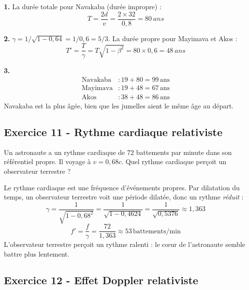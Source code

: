 \documentclass[12pt,a4paper]{article}
\begin{document}
\begin{boitecorrige}
\textbf{1.} La durée totale pour Navakaba (durée impropre) :
\[
T = \frac{2d}{v} = \frac{2\times32}{0{,}8} = \qty{80}{ans}
\]

\textbf{2.} $\gamma = 1/\sqrt{1-0{,}64} = 1/0{,}6 = 5/3$. La durée propre pour Mayimava et Akos :
\[
T' = \frac{T}{\gamma} = T\sqrt{1-\beta^2} = 80\times0{,}6 = \qty{48}{ans}
\]

\textbf{3.}
\begin{align*}
\text{Navakaba} &: 19+80 = \boxed{99\,\text{ans}}\\
\text{Mayimava}  &: 19+48 = \boxed{67\,\text{ans}}\\
\text{Akos}      &: 38+48 = \boxed{86\,\text{ans}}
\end{align*}
Navakaba est la plus âgée, bien que les jumelles aient le même âge au départ.
\end{boitecorrige}

\subsection*{Exercice 11 - Rythme cardiaque relativiste \niveau{\facile}}

\begin{boiteexercice}
Un astronaute a un rythme cardiaque de 72 battements par minute dans son référentiel propre. Il voyage à $v = 0{,}68c$. Quel rythme cardiaque perçoit un observateur terrestre ?
\end{boiteexercice}

\begin{boitecorrige}
Le rythme cardiaque est une fréquence d'événements propres. Par dilatation du temps, un observateur terrestre voit une période dilatée, donc un rythme \emph{réduit} :
\[
\gamma = \frac{1}{\sqrt{1-0{,}68^2}} = \frac{1}{\sqrt{1-0{,}4624}} = \frac{1}{\sqrt{0{,}5376}} \approx 1{,}363
\]
\[
f' = \frac{f}{\gamma} = \frac{72}{1{,}363} \approx \boxed{53\,\text{battements/min}}
\]
L'observateur terrestre perçoit un rythme ralenti : le c\oe{}ur de l'astronaute semble battre plus lentement.
\end{boitecorrige}

\subsection*{Exercice 12 - Effet Doppler relativiste \niveau{\moyen}}
\end{document}
